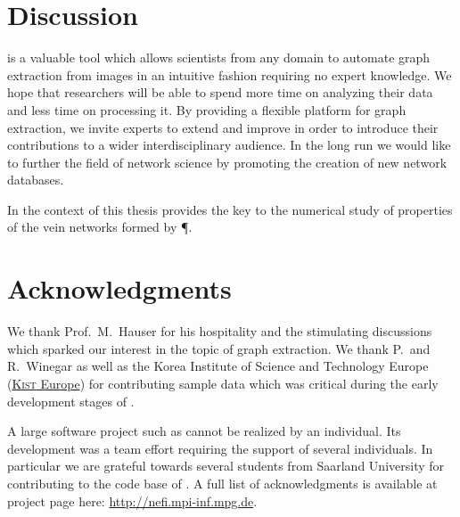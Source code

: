 \section{Discussion}

	\NEFI is a valuable tool which allows scientists from any domain to automate graph extraction from images in an intuitive fashion requiring no expert knowledge. We hope that researchers will be able to spend more time on analyzing their data and less time on processing it. By providing a flexible platform for graph extraction, we invite experts to extend and improve \NEFI in order to introduce their contributions to a wider interdisciplinary audience. In the long run we would like \NEFI to further the field of network science by promoting the creation of new network databases.

	In the context of this thesis \NEFI provides the key to the numerical study of properties of the vein networks formed by \P.

\section{Acknowledgments}

	We thank Prof.~M.~Hauser for his hospitality and the stimulating discussions which sparked our interest in the topic of graph extraction. We thank P.~and R.~Winegar as well as the Korea Institute of Science and Technology Europe (\href{www.kist-europe.de}{\textsc{Kist} Europe}) for contributing sample data which was critical during the early development stages of \NEFI.

	A large software project such as \NEFI cannot be realized by an individual. Its development was a team effort requiring the support of several individuals. In particular we are grateful towards several students from Saarland University for contributing to the code base of \NEFI. A full list of acknowledgments is available at \NEFIs project page here: \href{http://nefi.mpi-inf.mpg.de}{http://nefi.mpi-inf.mpg.de}.


